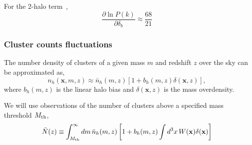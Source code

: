 \documentclass[preprint]{aastex}
\newcommand{\xv}{\mathbf{x}}
\newcommand{\nbar}{\bar{n}}
\newcommand{\mth}{M_{\rm th}}
\begin{document}
For the 2-halo term~\citep[eq. 39 of][]{takada2013}, 
\begin{equation}
	\frac{\partial \ln P(k)}{\partial \delta_b} \approx 
	\frac{68}{21}
\end{equation}

\subsubsection{Cluster counts fluctuations}
The number density of clusters of a given mass $m$ and redshift $z$ over the 
sky can be approximated as,
\begin{equation}
	n_{h}(\xv, m, z) \approx \nbar_{h}(m, z)
	\left[1 + b_{h}(m,z) \delta(\xv, z)\right],
\end{equation}
where $b_{h}(m,z)$ is the linear halo bias and
$\delta(\xv,z)$ is the mass overdensity.

We will use observations of the number of clusters above a 
specified mass threshold $\mth$,
\begin{equation}
	\bar{N}(z) \equiv
	\int_{\mth}^{\infty} dm\, 
	\nbar_{h}(m,z)
	\left[
	1 + b_{h}(m,z)
	\int d^{3}x\, W(\xv) \delta(\xv)
	\right]
\end{equation}




\end{document}
